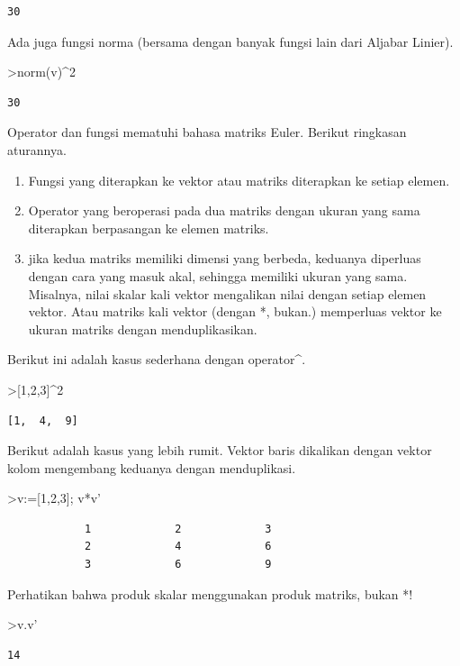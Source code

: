 \documentclass[
]{book}
\providecommand{\tightlist}{%
  \setlength{\itemsep}{0pt}\setlength{\parskip}{0pt}}
\begin{document}
\begin{verbatim}
30
\end{verbatim}

Ada juga fungsi norma (bersama dengan banyak fungsi lain dari Aljabar Linier).

\textgreater norm(v)\^{}2

\begin{verbatim}
30
\end{verbatim}

Operator dan fungsi mematuhi bahasa matriks Euler. Berikut ringkasan aturannya.

\begin{enumerate}
\def\labelenumi{\arabic{enumi}.}
\tightlist
\item
  Fungsi yang diterapkan ke vektor atau matriks diterapkan ke setiap elemen.
\item
  Operator yang beroperasi pada dua matriks dengan ukuran yang sama diterapkan berpasangan ke elemen matriks.
\item
  jika kedua matriks memiliki dimensi yang berbeda, keduanya diperluas dengan cara yang masuk akal, sehingga memiliki ukuran yang sama. Misalnya, nilai skalar kali vektor mengalikan nilai dengan setiap elemen vektor. Atau matriks kali vektor (dengan *, bukan.) memperluas vektor ke ukuran matriks dengan menduplikasikan.
\end{enumerate}

Berikut ini adalah kasus sederhana dengan operator\^{}.

\textgreater{[}1,2,3{]}\^{}2

\begin{verbatim}
[1,  4,  9]
\end{verbatim}

Berikut adalah kasus yang lebih rumit. Vektor baris dikalikan dengan vektor kolom mengembang keduanya dengan menduplikasi.

\textgreater v:={[}1,2,3{]}; v*v'

\begin{verbatim}
            1             2             3 
            2             4             6 
            3             6             9 
\end{verbatim}

Perhatikan bahwa produk skalar menggunakan produk matriks, bukan *!

\textgreater v.v'

\begin{verbatim}
14
\end{verbatim}
\end{document}
